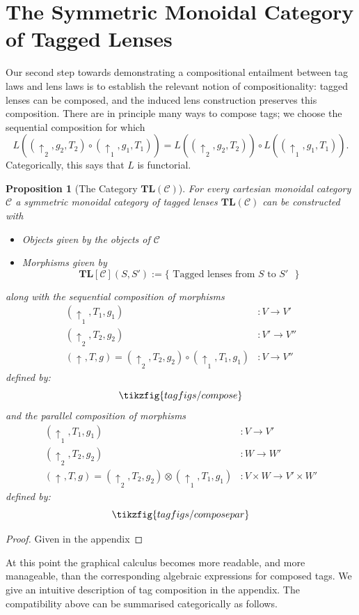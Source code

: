 \documentclass[a4paper,11pt]{article}
\newcommand{\cat}{\mathbf}
\newcommand{\putt}[1]{\mathbin{\uparrow_{#1}}}
\theoremstyle{definition}
\theoremstyle{plain}
\newtheorem{prop}{Proposition}
\theoremstyle{plain}
\theoremstyle{definition}
\begin{document}
\section{The Symmetric Monoidal Category of Tagged Lenses}
Our second step towards demonstrating a compositional entailment between tag laws and lens laws is to establish the relevant notion of compositionality: tagged lenses can be composed, and the induced lens construction preserves this composition. There are in principle many ways to compose tags; we choose the sequential composition for which
\[
L((\putt{}_2,g_2,T_2) \circ (\putt{}_1,g_1,T_1)) = L((\putt{}_2,g_2,T_2)) \circ L((\putt{}_1,g_1,T_1)).
\]
Categorically, this says that $L$ is functorial.
\begin{prop}[The Category $\cat{TL}(\mathcal{C})$]
For every cartesian monoidal category $\mathcal{C}$ a symmetric monoidal category of tagged lenses $\cat{TL}(\mathcal{C})$ can be constructed with
\begin{itemize}
    \item Objects given by the objects of $\mathcal{C}$
    \item Morphisms given by \[\mathbf{TL}[\mathcal{C}](S,S') := \{ \textrm{ Tagged lenses from $S$ to $S'$ }\}\]
\end{itemize}
along with the sequential composition of morphisms 
\begin{align}
    (\putt{}_1,T_1,g_1) & : V \rightarrow V' \\
    (\putt{}_2,T_2,g_2) & : V' \rightarrow V'' \\
(\putt{},T,g) = (\putt{}_2,T_2,g_2) \circ (\putt{}_1,T_1,g_1) & : V \rightarrow V'' 
\end{align}
defined by: \[\tikzfig{tagfigs/compose}\]
and the parallel composition of morphisms
\begin{align}
    (\putt{}_1,T_1,g_1) & : V \rightarrow V' \\
    (\putt{}_2,T_2,g_2) & : W \rightarrow W' \\
(\putt{},T,g) = (\putt{}_2,T_2,g_2) \otimes (\putt{}_1,T_1,g_1) & : V \times W \rightarrow V' \times W' 
\end{align}
defined by: \[\tikzfig{tagfigs/composepar}\]
\end{prop}
\begin{proof}
Given in the appendix
\end{proof}
At this point the graphical calculus becomes more readable, and more manageable, than the corresponding algebraic expressions for composed tags. We give an intuitive description of tag composition in the appendix. The compatibility above can be summarised categorically as follows.
\end{document}

